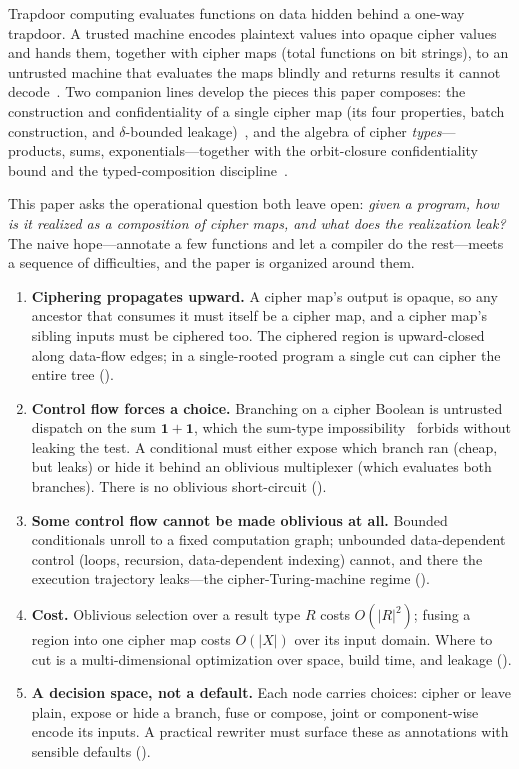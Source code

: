 \documentclass[11pt]{article}
\theoremstyle{definition}
\theoremstyle{plain}
\theoremstyle{remark}
\begin{document}
Trapdoor computing evaluates functions on data hidden behind a one-way
trapdoor.
A trusted machine encodes plaintext values into opaque cipher values and
hands them, together with cipher maps (total functions on bit strings),
to an untrusted machine that evaluates the maps blindly and returns
results it cannot decode~\cite{towell2026cipher}.
Two companion lines develop the pieces this paper composes: the
construction and confidentiality of a single cipher map (its four
properties, batch construction, and $\delta$-bounded
leakage)~\cite{towell2026cipher}, and the algebra of cipher
\emph{types}---products, sums, exponentials---together with the
orbit-closure confidentiality bound and the typed-composition
discipline~\cite{towell2026algebraic}.

This paper asks the operational question both leave open: \emph{given a
program, how is it realized as a composition of cipher maps, and what
does the realization leak?}
The naive hope---annotate a few functions and let a compiler do the
rest---meets a sequence of difficulties, and the paper is organized
around them.

\begin{enumerate}
\item \textbf{Ciphering propagates upward.}
  A cipher map's output is opaque, so any ancestor that consumes it must
  itself be a cipher map, and a cipher map's sibling inputs must be
  ciphered too.
  The ciphered region is upward-closed along data-flow edges; in a
  single-rooted program a single cut can cipher the entire tree
  ().

\item \textbf{Control flow forces a choice.}
  Branching on a cipher Boolean is untrusted dispatch on the sum
  $\mathbf{1}+\mathbf{1}$, which the sum-type
  impossibility~\cite{towell2026algebraic} forbids without leaking the
  test.
  A conditional must either expose which branch ran (cheap, but leaks)
  or hide it behind an oblivious multiplexer (which evaluates both
  branches).
  There is no oblivious short-circuit ().

\item \textbf{Some control flow cannot be made oblivious at all.}
  Bounded conditionals unroll to a fixed computation graph; unbounded
  data-dependent control (loops, recursion, data-dependent indexing)
  cannot, and there the execution trajectory leaks---the
  cipher-Turing-machine regime ().

\item \textbf{Cost.}
  Oblivious selection over a result type $R$ costs $O(|R|^2)$; fusing a
  region into one cipher map costs $O(|X|)$ over its input domain.
  Where to cut is a multi-dimensional optimization over space, build
  time, and leakage ().

\item \textbf{A decision space, not a default.}
  Each node carries choices: cipher or leave plain, expose or hide a
  branch, fuse or compose, joint or component-wise encode its inputs.
  A practical rewriter must surface these as annotations with sensible
  defaults ().
\end{enumerate}
\end{document}
